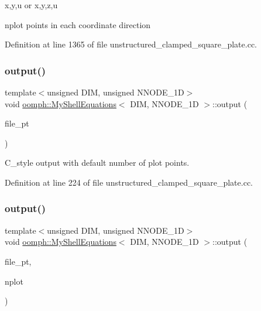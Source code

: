 x,y,u or x,y,z,u

nplot points in each coordinate direction 

Definition at line 1365 of file unstructured\+\_\+clamped\+\_\+square\+\_\+plate.\+cc.

\mbox{\label{classoomph_1_1MyShellEquations_aa8411334811e9b382d2c96051ac4b2ba}} 
\subsubsection{\texorpdfstring{output()}{output()}\hspace{0.1cm}{\footnotesize\ttfamily [3/4]}}
{\footnotesize\ttfamily template$<$unsigned D\+IM, unsigned N\+N\+O\+D\+E\+\_\+1D$>$ \\
void \hyperlink{classoomph_1_1MyShellEquations}{oomph\+::\+My\+Shell\+Equations}$<$ D\+IM, N\+N\+O\+D\+E\+\_\+1D $>$\+::output (\begin{DoxyParamCaption}\item[{F\+I\+LE $\ast$}]{file\+\_\+pt }\end{DoxyParamCaption})\hspace{0.3cm}{\ttfamily [inline]}}



C\+\_\+style output with default number of plot points. 



Definition at line 224 of file unstructured\+\_\+clamped\+\_\+square\+\_\+plate.\+cc.

\mbox{\label{classoomph_1_1MyShellEquations_adc1fcb6052b2cd07efe4d7d841ed6723}} 
\subsubsection{\texorpdfstring{output()}{output()}\hspace{0.1cm}{\footnotesize\ttfamily [4/4]}}
{\footnotesize\ttfamily template$<$unsigned D\+IM, unsigned N\+N\+O\+D\+E\+\_\+1D$>$ \\
void \hyperlink{classoomph_1_1MyShellEquations}{oomph\+::\+My\+Shell\+Equations}$<$ D\+IM, N\+N\+O\+D\+E\+\_\+1D $>$\+::output (\begin{DoxyParamCaption}\item[{F\+I\+LE $\ast$}]{file\+\_\+pt,  }\item[{const unsigned \&}]{nplot }\end{DoxyParamCaption})}



